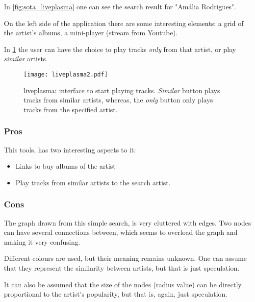 In \ref{fig:sota_liveplasma} one can see the search result for "Amália Rodrigues".

On the left side of the application there are some interesting elements: a grid of the artist's albums, a mini-player (stream from Youtube).

In \ref{fig:sota_liveplasma2} the user can have the choice to play tracks \emph{only} from that artist, or play \emph{similar} artists.

\begin{figure}[b]
  \begin{center}
    \texttt{[image: liveplasma2.pdf]}
  \end{center}
  \caption{liveplasma: interface to start playing tracks. \emph{Similar} button plays tracks from similar artists, whereas, the \emph{only} button only plays tracks from the specified artist.}
  \label{fig:sota_liveplasma2}
\end{figure}

\subsubsection{Pros} %
\label{ssub:liveplasma_pros}

This tools, has two interesting aspects to it:

\begin{itemize}
  \item Links to buy albums of the artist
  \item Play tracks from similar artists to the search artist.
\end{itemize}


\subsubsection{Cons} %
\label{ssub:liveplasma_cons}

The graph drawn from this simple search, is very cluttered with edges.
Two nodes can have several connections between, which seems to overload the graph and making it very confusing.

Different colours are used, but their meaning remains unknown. One can assume that they represent the similarity between artists, but that is just speculation.

It can also be assumed that the size of the nodes (radius value) can be directly proportional to the artist's popularity, but that is, again, just speculation.

